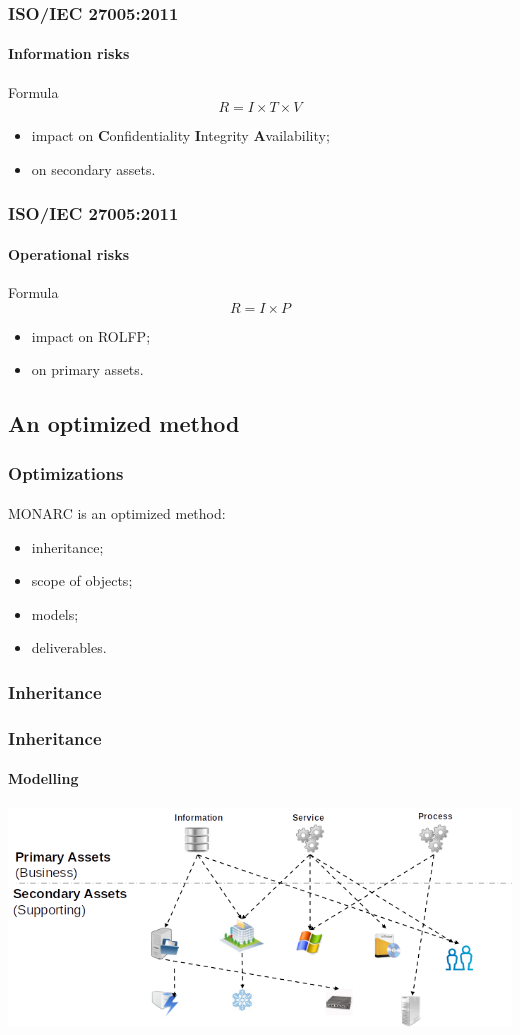 \begin{frame}
    \frametitle{ISO/IEC 27005:2011}
    \framesubtitle{Information risks}
    \begin{block}{Formula}
        $$R = I \times T \times V$$
        \begin{itemize}
            \item impact on \textbf{C}onfidentiality \textbf{I}ntegrity \textbf{A}vailability;
            \item on secondary assets.
        \end{itemize}
    \end{block}
\end{frame}


\begin{frame}
    \frametitle{ISO/IEC 27005:2011}
    \framesubtitle{Operational risks}
    \begin{block}{Formula}
        $$R = I \times P$$
        \begin{itemize}
            \item impact on ROLFP;
            \item on primary assets.
        \end{itemize}
    \end{block}
\end{frame}


\subsection{An optimized method}
\begin{frame}
    \frametitle{Optimizations}
    \framesubtitle{}
    MONARC is an optimized method:
    \begin{itemize}
        \item inheritance;
        \item scope of objects;
        \item models;
        \item deliverables.
    \end{itemize}
\end{frame}

\subsubsection{Inheritance}
\begin{frame}
    \frametitle{Inheritance}
    \framesubtitle{Modelling}
    \begin{center}
        \includegraphics[scale=0.45]{./images/MONARC-method-modelling.png}
    \end{center}
\end{frame}

